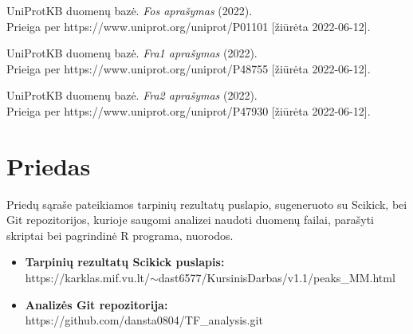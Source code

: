 \documentclass[12pt]{article}
\begin{document}
\begin{thebibliography}{99}
 UniProtKB duomenų bazė. \emph{Fos aprašymas} (2022).\\
Prieiga per https://www.uniprot.org/uniprot/P01101 [žiūrėta 2022-06-12].

 UniProtKB duomenų bazė. \emph{Fra1 aprašymas} (2022).\\
Prieiga per https://www.uniprot.org/uniprot/P48755 [žiūrėta 2022-06-12].

 UniProtKB duomenų bazė. \emph{Fra2 aprašymas} (2022).\\
Prieiga per https://www.uniprot.org/uniprot/P47930 [žiūrėta 2022-06-12].

\end{thebibliography}

\newpage


\section{Priedas}

Priedų sąraše pateikiamos tarpinių rezultatų puslapio, sugeneruoto su Scikick,
bei Git repozitorijos, kurioje saugomi analizei naudoti duomenų failai,
parašyti skriptai bei pagrindinė R programa, nuorodos.

\begin{itemize}
    \item \textbf{Tarpinių rezultatų Scikick puslapis:}\\
        https://karklas.mif.vu.lt/\(\sim\)dast6577/KursinisDarbas/v1.1/peaks\_MM.html
    \item \textbf{Analizės Git repozitorija:}\\
        https://github.com/dansta0804/TF\_analysis.git
  \end{itemize}
\end{document}
